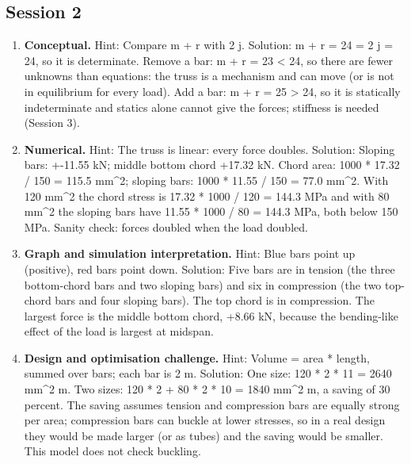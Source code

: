 \documentclass[11pt,a4paper]{article}
\begin{document}
\subsection*{Session 2}
\begin{enumerate}[nosep]
\item \textbf{Conceptual.} Hint: Compare m + r with 2 j. Solution: m + r = 24 = 2 j = 24, so it is determinate. Remove a bar: m + r = 23 \textless{} 24, so there are fewer unknowns than equations: the truss is a mechanism and can move (or is not in equilibrium for every load). Add a bar: m + r = 25 \textgreater{} 24, so it is statically indeterminate and statics alone cannot give the forces; stiffness is needed (Session 3).
\item \textbf{Numerical.} Hint: The truss is linear: every force doubles. Solution: Sloping bars: +-11.55 kN; middle bottom chord +17.32 kN. Chord area: 1000 * 17.32 / 150 = 115.5 mm\textasciicircum{}2; sloping bars: 1000 * 11.55 / 150 = 77.0 mm\textasciicircum{}2. With 120 mm\textasciicircum{}2 the chord stress is 17.32 * 1000 / 120 = 144.3 MPa and with 80 mm\textasciicircum{}2 the sloping bars have 11.55 * 1000 / 80 = 144.3 MPa, both below 150 MPa. Sanity check: forces doubled when the load doubled.
\item \textbf{Graph and simulation interpretation.} Hint: Blue bars point up (positive), red bars point down. Solution: Five bars are in tension (the three bottom-chord bars and two sloping bars) and six in compression (the two top-chord bars and four sloping bars). The top chord is in compression. The largest force is the middle bottom chord, +8.66 kN, because the bending-like effect of the load is largest at midspan.
\item \textbf{Design and optimisation challenge.} Hint: Volume = area * length, summed over bars; each bar is 2 m. Solution: One size: 120 * 2 * 11 = 2640 mm\textasciicircum{}2 m. Two sizes: 120 * 2 + 80 * 2 * 10 = 1840 mm\textasciicircum{}2 m, a saving of 30 percent. The saving assumes tension and compression bars are equally strong per area; compression bars can buckle at lower stresses, so in a real design they would be made larger (or as tubes) and the saving would be smaller. This model does not check buckling.
\end{enumerate}
\end{document}
